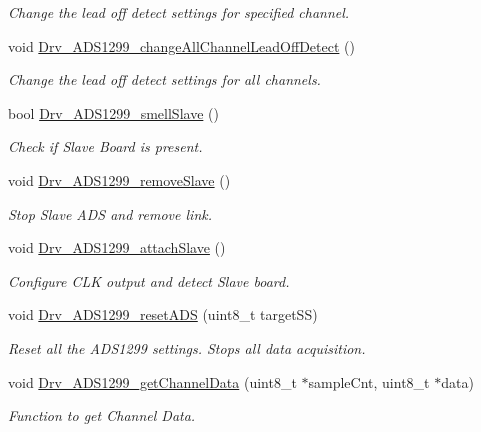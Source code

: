\begin{DoxyCompactItemize}
\begin{DoxyCompactList}\small\item\em Change the lead off detect settings for specified channel. \end{DoxyCompactList}\item 
void \hyperlink{group___a_d_s1299___library_gacd21ec90227bde9bcbe7d17924763972}{Drv\+\_\+\+A\+D\+S1299\+\_\+change\+All\+Channel\+Lead\+Off\+Detect} ()
\begin{DoxyCompactList}\small\item\em Change the lead off detect settings for all channels. \end{DoxyCompactList}\item 
bool \hyperlink{group___a_d_s1299___library_ga9d74c4bec77d3719c9334d953e2ac590}{Drv\+\_\+\+A\+D\+S1299\+\_\+smell\+Slave} ()
\begin{DoxyCompactList}\small\item\em Check if Slave Board is present. \end{DoxyCompactList}\item 
void \hyperlink{group___a_d_s1299___library_gab6a161f709334920b4f69156fe0ce928}{Drv\+\_\+\+A\+D\+S1299\+\_\+remove\+Slave} ()
\begin{DoxyCompactList}\small\item\em Stop Slave A\+D\+S and remove link. \end{DoxyCompactList}\item 
void \hyperlink{group___a_d_s1299___library_ga3da68a8b941049250800fc068c07a601}{Drv\+\_\+\+A\+D\+S1299\+\_\+attach\+Slave} ()
\begin{DoxyCompactList}\small\item\em Configure C\+L\+K output and detect Slave board. \end{DoxyCompactList}\item 
void \hyperlink{group___a_d_s1299___library_gaf00abe725d1194171c9b84ab1c9aa356}{Drv\+\_\+\+A\+D\+S1299\+\_\+reset\+A\+D\+S} (uint8\+\_\+t target\+S\+S)
\begin{DoxyCompactList}\small\item\em Reset all the A\+D\+S1299 settings. Stops all data acquisition. \end{DoxyCompactList}\item 
void \hyperlink{group___a_d_s1299___library_ga7b9304053ccfe17319cc73d1c5c738c1}{Drv\+\_\+\+A\+D\+S1299\+\_\+get\+Channel\+Data} (uint8\+\_\+t $\ast$sample\+Cnt, uint8\+\_\+t $\ast$data)
\begin{DoxyCompactList}\small\item\em Function to get Channel Data. \end{DoxyCompactList}\end{DoxyCompactItemize}

